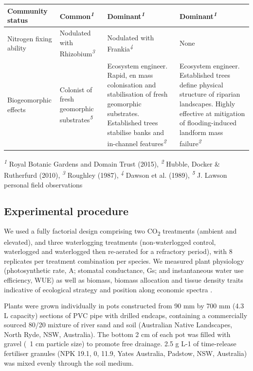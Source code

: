 \documentclass[12pt,a4paper]{memoir}
\begin{document}
\begin{threeparttable}[h!]
\begin{tabularx}{\textwidth}{XXXX}
Community status & Common\textit{\textsuperscript{1}} & Dominant\textit{\textsuperscript{1}} & Dominant\textit{\textsuperscript{1}} \\ \hline
Nitrogen fixing ability & Nodulated with Rhizobium\textit{\textsuperscript{3}} & Nodulated with Frankia\textit{\textsuperscript{4}} & None \\ \hline
Biogeomorphic effects & Colonist of fresh geomorphic substrates\textit{\textsuperscript{5}} & Ecosystem engineer. Rapid, en mass colonisation and stabilisation of fresh geomorphic substrates. Established trees stabilise banks and in-channel features\textit{\textsuperscript{2}} & Ecosystem engineer. Established trees define physical structure of riparian landscapes. Highly effective at mitigation of flooding-induced landform mass failure\textit{\textsuperscript{2}} \\ \hline
\end{tabularx}
  \begin{tablenotes}
    \item \textit{\textsuperscript{1}} Royal Botanic Gardens and Domain Trust (2015), \textit{\textsuperscript{2}} Hubble, Docker & Rutherfurd (2010), \textit{\textsuperscript{3}} Roughley (1987), \textit{\textsuperscript{4}} Dawson et al. (1989), \textit{\textsuperscript{5}} J. Lawson personal field observations
  \end{tablenotes}
\end{threeparttable}

\clearpage

\subsection*{Experimental procedure}
We used a fully factorial design comprising two CO\textsubscript{2} treatments (ambient and elevated), and three waterlogging treatments (non-waterlogged control, waterlogged and waterlogged then re-aerated for a refractory period), with 8 replicates per treatment combination per species. We measured plant physiology (photosynthetic rate, A; stomatal conductance, Gs; and instantaneous water use efficiency, WUE) as well as biomass, biomass allocation and tissue density traits indicative of ecological strategy and position along economic spectra \citep{Reich2014}.

Plants were grown individually in pots constructed from 90 mm by 700 mm (4.3 L capacity) sections of PVC pipe with drilled endcaps, containing a commercially sourced 80/20 mixture of river sand and soil (Australian Native Landscapes, North Ryde, NSW, Australia). The bottom 2 cm of each pot was filled with gravel (~1 cm particle size) to promote free drainage. 2.5 g L-1 of time-release fertiliser granules (NPK 19.1, 0, 11.9, Yates Australia, Padstow, NSW, Australia) was mixed evenly through the soil medium.
\end{document}
